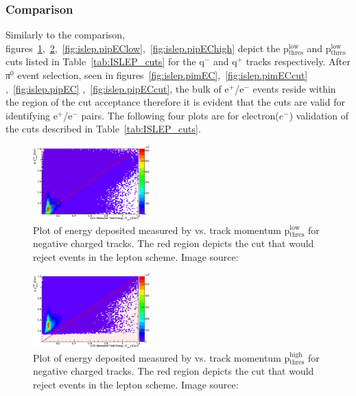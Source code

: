 \FloatBarrier






\subsubsection{\label{sec:data.lepton.ec} Comparison}

Similarly to the  comparison, figures~\ref{fig:islep.pimEClow},~\ref{fig:islep.pimEChigh},~\ref{fig:islep.pipEClow},~\ref{fig:islep.pipEChigh} depict the  p$\mathrm{_{thres}^{low}}$ and  p$\mathrm{_{thres}^{low}}$ cuts listed in  Table~\ref{tab:ISLEP_cuts} for the q$^-$ and q$^+$ tracks respectively. After π$^0$ event selection, seen in figures~\ref{fig:islep.pimEC},~\ref{fig:islep.pimECcut} ,~\ref{fig:islep.pipEC} ,~\ref{fig:islep.pipECcut}, the bulk of e$^+$/e$^-$ events reside within the region of the cut acceptance therefore it is evident that the   cuts are valid for identifying e$^+$/e$^-$ pairs. The following four plots are for electron($e^-$)  validation of the   cuts described in Table~\ref{tab:ISLEP_cuts}.
%
\begin{figure}\begin{center}
\includegraphics[width=0.4\textwidth]{figures/lepton/Pim_EClow.eps}
\caption[ Deposited Energy Comparison to Lower Threshold Track Momentum for q$^-$ Tracks]{\label{fig:islep.pimEClow}Plot of energy deposited measured by  vs. track momentum p$\mathrm{_{thres}^{low}}$ for negative charged tracks. The red region depicts the cut that would reject events in the  lepton   scheme. Image source:~\cite{clas.thesis.kunkel}}
\end{center}\end{figure}

\begin{figure}\begin{center}
\includegraphics[width=0.4\textwidth]{figures/lepton/Pim_EChigh.eps}
\caption[ Deposited Energy Comparison to Upper Threshold Track Momentum for q$^-$ Tracks]{\label{fig:islep.pimEChigh}Plot of energy deposited measured by  vs. track momentum p$\mathrm{_{thres}^{high}}$ for negative charged tracks. The red region depicts the cut that would reject events in the  lepton   scheme. Image source:~\cite{clas.thesis.kunkel}}
\end{center}\end{figure}


